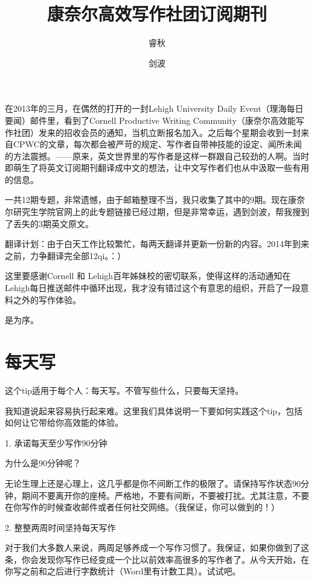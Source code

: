 \documentclass{ctexart}
\begin{document}
\kaishu
{}

\title {\large {\heiti 康奈尔高效写作社团订阅期刊}}
\author {睿秋 \and 剑波}
\maketitle

在2013年的三月，在偶然的打开的一封Lehigh University Daily Event（理海每日要闻）邮件里，看到了Cornell Productive Writing Community（康奈尔高效能写作社团）发来的招收会员的通知，当机立断报名加入。之后每个星期会收到一封来自CPWC的文章，每次都会被严苛的规定、写作者自带神技能的设定、闻所未闻的方法震撼。——原来，英文世界里的写作者是这样一群跟自己较劲的人啊。当时即萌生了将英文订阅期刊翻译成中文的想法，让中文写作者们也从中汲取一些有用的信息。

一共12期专题，非常遗憾，由于邮箱整理不当，我只收集了其中的9期。现在康奈尔研究生学院官网上的此专题链接已经过期，但是非常幸运，遇到剑波，帮我搜到了丢失的3期英文原文。

翻译计划：由于白天工作比较繁忙，每两天翻译并更新一份新的内容。2014年到来之前，力争翻译完全部12qi。：）

这里要感谢Cornell 和 Lehigh百年姊妹校的密切联系，使得这样的活动通知在Lehigh每日推送邮件中循环出现，我才没有错过这个有意思的组织，开启了一段意料之外的写作体验。

是为序。
\newpage

\tableofcontents %
\newpage %

\section{每天写}
这个tip适用于每个人：每天写。不管写些什么，只要每天坚持。

我知道说起来容易执行起来难。这里我们具体说明一下要如何实践这个tip，包括如何让它带给你高效能的体验。

1. 承诺每天至少写作90分钟

为什么是90分钟呢？

无论生理上还是心理上，这几乎都是你不间断工作的极限了。请保持写作状态90分钟，期间不要离开你的座椅。严格地，不要有间断，不要被打扰。尤其注意，不要在你写作的时候查收邮件或者任何社交网络。（我保证，你可以做到的！）

2. 整整两周时间坚持每天写作

对于我们大多数人来说，两周足够养成一个写作习惯了。我保证，如果你做到了这条，你会发现你写作已经变成一个比以前效率高很多的写作者了。从今天开始，在你写之前和之后进行字数统计（Word里有计数工具）。试试吧。
\end{document}
